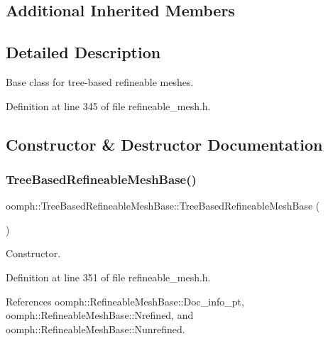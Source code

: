 \subsection*{Additional Inherited Members}


\subsection{Detailed Description}
Base class for tree-\/based refineable meshes. 

Definition at line 345 of file refineable\+\_\+mesh.\+h.



\subsection{Constructor \& Destructor Documentation}
\mbox{\label{classoomph_1_1TreeBasedRefineableMeshBase_aae094b3c6b773c0dbfbeba056c83eac6}} 
\subsubsection{\texorpdfstring{Tree\+Based\+Refineable\+Mesh\+Base()}{TreeBasedRefineableMeshBase()}\hspace{0.1cm}{\footnotesize\ttfamily [1/2]}}
{\footnotesize\ttfamily oomph\+::\+Tree\+Based\+Refineable\+Mesh\+Base\+::\+Tree\+Based\+Refineable\+Mesh\+Base (\begin{DoxyParamCaption}{ }\end{DoxyParamCaption})\hspace{0.3cm}{\ttfamily [inline]}}



Constructor. 



Definition at line 351 of file refineable\+\_\+mesh.\+h.



References oomph\+::\+Refineable\+Mesh\+Base\+::\+Doc\+\_\+info\+\_\+pt, oomph\+::\+Refineable\+Mesh\+Base\+::\+Nrefined, and oomph\+::\+Refineable\+Mesh\+Base\+::\+Nunrefined.

